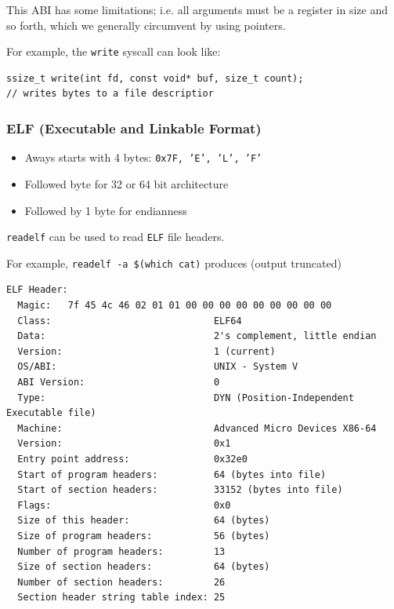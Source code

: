\documentclass[../notes.tex]{subfiles}
\begin{document}
This ABI has some limitations; i.e. all arguments must be a register in size and so forth, which we generally circumvent by using pointers.

For example, the \texttt{write} syscall can look like:


\begin{listing}[H]
\begin{verbatim}
ssize_t write(int fd, const void* buf, size_t count);
// writes bytes to a file descriptior
\end{verbatim}
\end{listing}


\subsubsection{ELF (Executable and Linkable Format)}


\begin{itemize}
  \item  Aways starts with 4 bytes: \texttt{0x7F, 'E', 'L', 'F'}
  \item Followed byte for 32 or 64 bit architecture
  \item Followed by 1 byte for endianness
\end{itemize}

\texttt{readelf} can be used to read \texttt{ELF} file headers.

For example, \texttt{readelf -a \$(which cat)} produces (output truncated)



\begin{listing}[H]
\begin{verbatim}
ELF Header:
  Magic:   7f 45 4c 46 02 01 01 00 00 00 00 00 00 00 00 00
  Class:                             ELF64
  Data:                              2's complement, little endian
  Version:                           1 (current)
  OS/ABI:                            UNIX - System V
  ABI Version:                       0
  Type:                              DYN (Position-Independent Executable file)
  Machine:                           Advanced Micro Devices X86-64
  Version:                           0x1
  Entry point address:               0x32e0
  Start of program headers:          64 (bytes into file)
  Start of section headers:          33152 (bytes into file)
  Flags:                             0x0
  Size of this header:               64 (bytes)
  Size of program headers:           56 (bytes)
  Number of program headers:         13
  Size of section headers:           64 (bytes)
  Number of section headers:         26
  Section header string table index: 25
\end{verbatim}
\end{listing}
\end{document}
